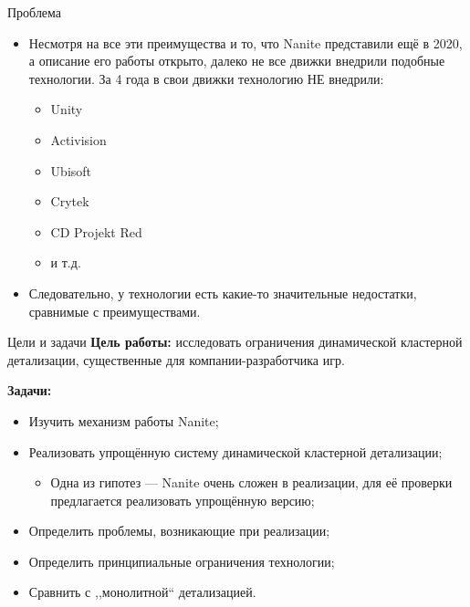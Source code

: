 \documentclass{beamer}
\begin{document}
    \begin{frame}{Проблема}
        \begin{itemize}
            \item Несмотря на все эти преимущества и то,
            что Nanite представили ещё в 2020,
            а описание его работы открыто,
            далеко не все движки внедрили подобные технологии.
            За 4 года в свои движки технологию НЕ внедрили:
            \begin{itemize}
                \item Unity
                \item Activision
                \item Ubisoft
                \item Crytek
                \item CD Projekt Red
                \item и т.д.
            \end{itemize}

            \item Следовательно, у технологии есть
            какие-то значительные недостатки,
            сравнимые с преимуществами.
        \end{itemize}
    \end{frame}

    \begin{frame}{Цели и задачи}
        \textbf{Цель работы:}
        исследовать ограничения динамической кластерной детализации,
        существенные для компании-разработчика игр.

        \bigskip

        \textbf{Задачи:}
        \begin{itemize}
            \item Изучить механизм работы Nanite;
            \item Реализовать упрощённую систему
            динамической кластерной детализации;
            \begin{itemize}
                \item Одна из гипотез --- Nanite
                очень сложен в реализации,
                для её проверки предлагается реализовать
                упрощённую версию;
            \end{itemize}
            \item Определить проблемы, возникающие при реализации;
            \item Определить принципиальные ограничения технологии;
            \item Сравнить с ,,монолитной`` детализацией.
        \end{itemize}
    \end{frame}
\end{document}
